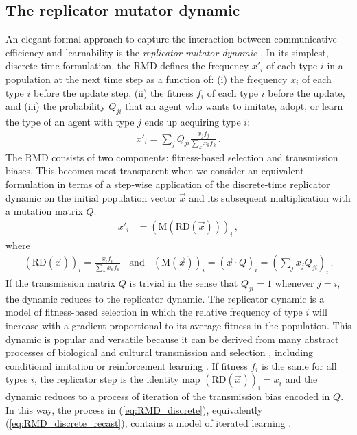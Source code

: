 \documentclass[a4paper, 11pt]{article}
\theoremstyle{Satz}
\begin{document}
\subsection{The replicator mutator dynamic}

An elegant formal approach to capture the interaction between communicative efficiency and learnability is
the \emph{replicator mutator dynamic}
\citep{Hofbauer1985:The-Selection-M,nowak+etal:2000,NowakKomarova2001:Evolution-of-Un,hofbauer+sigmund:2003,Nowak2006:Evolutionary-Dy}. In
its simplest, discrete-time formulation, the RMD defines the frequency $x'_i$ of each type $i$
in a population at the next time step as a function of: (i) the frequency $x_i$ of each type
$i$ before the update step, (ii) the fitness $f_i$ of each type $i$ before the update, and
(iii) the probability $Q_{ji}$ that an agent who wants to imitate, adopt, or learn the type of
an agent with type $j$ ends up acquiring type $i$:
\begin{align}
  \label{eq:RMD_discrete}
  x'_i = \sum_j Q_{ji} \frac{x_jf_j}{\sum_k x_k f_k}\,.
\end{align}
The RMD consists of two components: fitness-based selection and transmission biases. This
becomes most transparent when we consider an equivalent formulation in terms of a step-wise
application of the discrete-time replicator dynamic \citep{TaylorJonker1978:Evolutionary-St} on the initial population vector $\vec{x}$
and its subsequent multiplication with a mutation matrix $Q$:
\begin{align}
  \label{eq:RMD_discrete_recast}
  x'_i & = (\text{M}(\text{RD}(\vec{x})))_i\,,
\end{align}
where
\begin{align*}
      \left ( \text{RD}(\vec{x}) \right )_i 
         = \frac{x_i f_i}{\sum_k x_k f_k}
 \ \ \ \ \text{and} \ \ \ \ 
  (\text{M}(\vec{x}))_i = (\vec{x} \cdot Q)_i = \left ( \sum_j
          x_j Q_{ji} \right)_i\,.
\end{align*}
If the transmission matrix $Q$ is trivial in the sense that $Q_{ji}=1$ whenever $j=i$, the
dynamic reduces to the replicator dynamic. The replicator dynamic is a model of fitness-based
selection in which the relative frequency of type $i$ will increase with a gradient
proportional to its average fitness in the population. This dynamic is popular and
versatile because it can be derived from many abstract processes of biological and cultural
transmission and selection \citep[for overview and several derivations
see][]{Sandholm2010:Population-Game}, including conditional imitation
\citep[e.g.,][]{Helbing1996:A-Stochastic-Be,Schlag1998:Why-Imitate-and} or reinforcement
learning \citep[e.g.,][]{BorgersSarin997:Learning-Throug,Beggs2005:On-the-Converge}. If fitness
$f_i$ is the same for all types $i$, the replicator step is the identity map
$ \left ( \text{RD}(\vec{x}) \right )_i = x_i$ and the dynamic reduces to a process of
iteration of the transmission bias encoded in $Q$. In this way, the process in
(\ref{eq:RMD_discrete}), equivalently (\ref{eq:RMD_discrete_recast}), contains a model of
iterated learning \citep{griffiths+kalish:2007}. 
\end{document}
